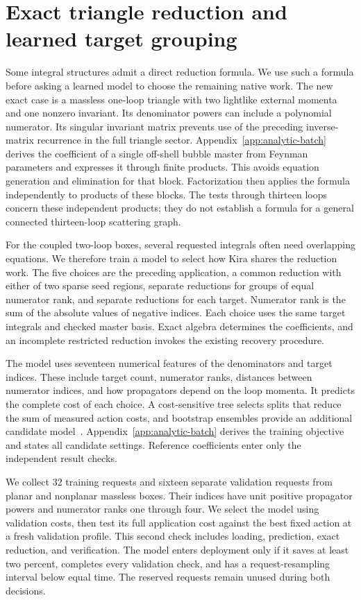 \section{Exact triangle reduction and learned target grouping}
\label{sec:analytic-batch-method}
Some integral structures admit a direct reduction formula. We use such a formula before asking a learned model to choose the remaining native work. The new exact case is a massless one-loop triangle with two lightlike external momenta and one nonzero invariant. Its denominator powers can include a polynomial numerator. Its singular invariant matrix prevents use of the preceding inverse-matrix recurrence in the full triangle sector. Appendix~\ref{app:analytic-batch} derives the coefficient of a single off-shell bubble master from Feynman parameters and expresses it through finite products. This avoids equation generation and elimination for that block. Factorization then applies the formula independently to products of these blocks. The tests through thirteen loops concern these independent products; they do not establish a formula for a general connected thirteen-loop scattering graph.

For the coupled two-loop boxes, several requested integrals often need overlapping equations. We therefore train a model to select how Kira shares the reduction work. The five choices are the preceding application, a common reduction with either of two sparse seed regions, separate reductions for groups of equal numerator rank, and separate reductions for each target. Numerator rank is the sum of the absolute values of negative indices. Each choice uses the same target integrals and checked master basis. Exact algebra determines the coefficients, and an incomplete restricted reduction invokes the existing recovery procedure.

The model uses seventeen numerical features of the denominators and target indices. These include target count, numerator ranks, distances between numerator indices, and how propagators depend on the loop momenta. It predicts the complete cost of each choice. A cost-sensitive tree selects splits that reduce the sum of measured action costs, and bootstrap ensembles provide an additional candidate model~\cite{CART1984,Breiman1996Bagging}. Appendix~\ref{app:analytic-batch} derives the training objective and states all candidate settings. Reference coefficients enter only the independent result checks.

We collect 32 training requests and sixteen separate validation requests from planar and nonplanar massless boxes. Their indices have unit positive propagator powers and numerator ranks one through four. We select the model using validation costs, then test its full application cost against the best fixed action at a fresh validation profile. This second check includes loading, prediction, exact reduction, and verification. The model enters deployment only if it saves at least two percent, completes every validation check, and has a request-resampling interval below equal time. The reserved requests remain unused during both decisions.

